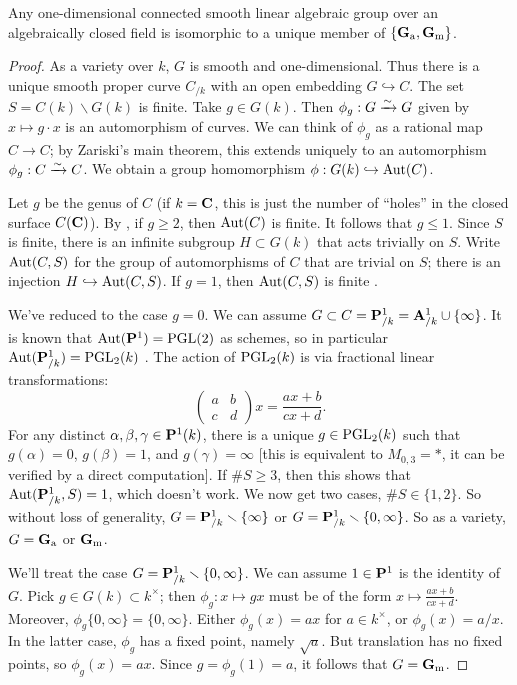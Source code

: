 \begin{theorem}\label{thm:1d-class}
Any one-dimensional connected smooth linear algebraic group over an 
algebraically closed field is isomorphic to a unique member of 
$\{\mathbf{G}_\mathrm{a},\mathbf{G}_\mathrm{m}\}$. 
\end{theorem}
\begin{proof}
As a variety over $k$, $G$ is smooth and one-dimensional. Thus there is a 
unique smooth proper curve $C_{/k}$ with 
an open embedding $G\hookrightarrow C$. The set $S=C(k)\smallsetminus G(k)$ is 
finite. Take $g\in G(k)$. Then $\phi_g:G\xrightarrow\sim G$ 
given by $x\mapsto g\cdot x$ is an automorphism of curves. We can think of 
$\phi_g$ as a rational map $C\to C$; by Zariski's main theorem, this extends 
uniquely to an automorphism $\phi_g:C\xrightarrow\sim C$. 
We obtain a group homomorphism $\phi:G(k)\hookrightarrow \operatorname{Aut}(C)$. 

Let 
$g$ be the genus of $C$ (if $k=\mathbf{C}$, this is just the number of ``holes'' in 
the closed surface $C(\mathbf{C})$). By \cite[IV ex 5.2]{hartshorne-1977}, if $g\geqslant 2$, then 
$\operatorname{Aut}(C)$ is finite. It follows that $g\leqslant 1$. Since $S$ is 
finite, there is an infinite subgroup $H\subset G(k)$ that acts trivially on 
$S$. Write $\operatorname{Aut}(C,S)$ for the group of automorphisms of $C$ that 
are trivial on $S$; there is an injection $H\hookrightarrow \operatorname{Aut}(C,S)$. If 
$g=1$, then $\operatorname{Aut}(C,S)$ is finite \cite[IV cor 4.7]{hartshorne-1977}. 

We've reduced to the case $g=0$. We can assume 
$G\subset C=\mathbf{P}^1_{/k} = \mathbf{A}^1_{/k}\cup \{\infty\}$. It is known 
that $\operatorname{Aut}(\mathbf{P}^1)=\operatorname{PGL}(2)$ as schemes, so in particular 
$\operatorname{Aut}(\mathbf{P}_{/k}^1) = \operatorname{PGL}_2(k)$ \cite[IV 7.1.1]{hartshorne-1977}. 
The action of $\operatorname{PGL}_2(k)$ is via 
fractional linear transformations: 
\[
  \begin{pmatrix} a & b \\ c & d \end{pmatrix} x = \frac{a x+b}{c x+d} .
\]
For any distinct $\alpha,\beta,\gamma\in \mathbf{P}^1(k)$, there is a unique 
$g\in \operatorname{PGL}_2(k)$ such that $g(\alpha)=0$, $g(\beta)=1$, and $g(\gamma)=\infty$ 
[this is equivalent to $M_{0,3}=\ast$, it can be verified by a direct 
computation]. If $\# S\geqslant 3$, then this shows that 
$\operatorname{Aut}(\mathbf{P}^1_{/k},S)=1$, which doesn't work. We now get two cases, 
$\# S\in \{1,2\}$. So without loss of generality, 
$G=\mathbf{P}^1_{/k}\smallsetminus \{\infty\}$ or 
$G=\mathbf{P}^1_{/k}\smallsetminus \{0,\infty\}$. So as a variety, $G=\mathbf{G}_\mathrm{a}$ or $\mathbf{G}_\mathrm{m}$. 

We'll treat the case $G=\mathbf{P}^1_{/k}\smallsetminus \{0,\infty\}$. We can assume 
$1\in \mathbf{P}^1$ is the identity of $G$. Pick $g\in G(k)\subset k^\times$; then 
$\phi_g:x\mapsto g x$ must be of the form $x\mapsto \frac{a x+b}{c x+d}$. 
Moreover, $\phi_g\{0,\infty\}=\{0,\infty\}$. Either $\phi_g(x)=a x$ 
for $a\in k^\times$, or $\phi_g(x)=a/x$. In the latter case, $\phi_g$ has a 
fixed point, namely $\sqrt a$. But translation has no fixed points, so 
$\phi_g(x)=a x$. Since $g=\phi_g(1)=a$, it follows that $G=\mathbf{G}_\mathrm{m}$. 
\end{proof}

